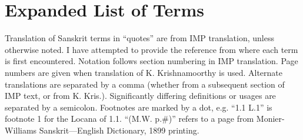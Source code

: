 \documentclass[10pt]{article}
\begin{document}
\newpage


\section{Expanded List of Terms}

Translation of Sanskrit terms in ``quotes'' are from IMP translation, unless otherwise noted.
I have attempted to provide the reference from where each term is first encountered.
Notation follows section numbering in IMP translation. Page numbers are given when translation of K. Krishnamoorthy is used.
Alternate translations are separated by a comma (whether from a subsequent section of IMP text, or from K. Kris.).
Significantly differing definitions or usages are separated by a semicolon.
Footnotes are marked by a dot, e.g. ``1.1 L.1'' is footnote 1 for the Locana of 1.1.
``(M.W. p.\#)'' refers to a page from Monier-Williams Sanskrit---English Dictionary, 1899 printing.
\end{document}
